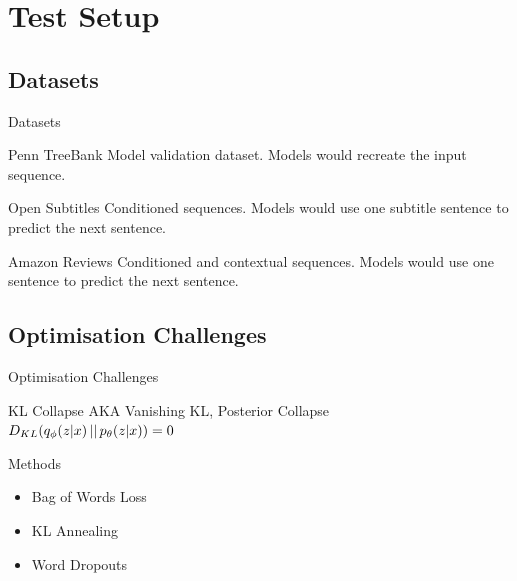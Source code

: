 \documentclass[aspectratio=169, 11pt]{beamer}
\begin{document}
\section{Test Setup}

\subsection{Datasets}
\begin{frame}{Datasets}

  \begin{block}{Penn TreeBank} 
  Model validation dataset. Models would recreate the input sequence.
  \end{block}
  \begin{block}{Open Subtitles} 
  Conditioned sequences. Models would use one subtitle sentence to predict the next sentence.
  \end{block}
  \begin{block}{Amazon Reviews} 
  Conditioned and contextual sequences. Models would use one sentence to predict the next sentence.
  \end{block}
\end{frame}

\subsection{Optimisation Challenges}
\begin{frame}{Optimisation Challenges}
  \begin{block}{KL Collapse}
  AKA Vanishing KL, Posterior Collapse\\
  $D_{KL}(q_{\phi}(z|x)\thinspace||\thinspace p_\theta(z|x)) = 0$
  \end{block}
  \begin{block}{Methods}
  \begin{itemize}
    \item Bag of Words Loss
    \item KL Annealing
    \item Word Dropouts
  \end{itemize}
  \end{block}
  \end{frame}
\end{document}
